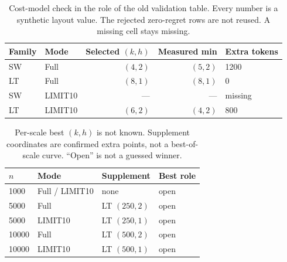 \begin{table}[t]
\caption{Cost-model check in the role of the old validation table. Every number is a synthetic layout value. The rejected zero-regret rows are not reused. A missing cell stays missing.}
\centering\footnotesize
\begin{tabular}{@{}llrrl@{}}
\toprule
Family & Mode & Selected $(k,h)$ & Measured min & Extra tokens \\
\midrule
SW & Full & $(4,2)$ & $(5,2)$ & 1200 \\
LT & Full & $(8,1)$ & $(8,1)$ & 0 \\
SW & LIMIT10 & --- & --- & missing \\
LT & LIMIT10 & $(6,2)$ & $(4,2)$ & 800 \\
\bottomrule
\end{tabular}
\end{table}

\begin{table}[t]
\caption{Per-scale best $(k,h)$ is not known. Supplement coordinates are confirmed extra points, not a best-of-scale curve. ``Open'' is not a guessed winner.}
\centering\footnotesize
\begin{tabular}{@{}lllp{3.2cm}@{}}
\toprule
$n$ & Mode & Supplement & Best role \\
\midrule
1000 & Full / LIMIT10 & none & open \\
5000 & Full & LT $(250,2)$ & open \\
5000 & LIMIT10 & LT $(250,1)$ & open \\
10000 & Full & LT $(500,2)$ & open \\
10000 & LIMIT10 & LT $(500,1)$ & open \\
\bottomrule
\end{tabular}
\end{table}
